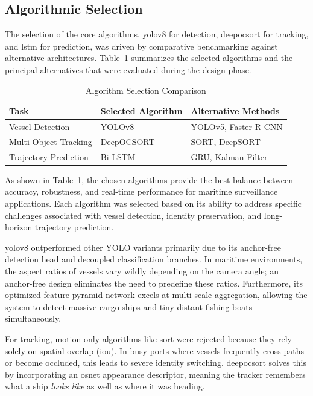 \subsection{Algorithmic Selection}


The selection of the core algorithms, \gls{yolov8} for detection, \gls{deepocsort} for tracking, and \gls{lstm} for prediction, was driven by comparative benchmarking against alternative architectures. Table~\ref{tab:algorithm_comparison} summarizes the selected algorithms and the principal alternatives that were evaluated during the design phase.


\begin{table}[H]
\centering
\caption{Algorithm Selection Comparison}
\label{tab:algorithm_comparison}
\begin{tabular}{|l|l|l|}
\hline
\textbf{Task} & \textbf{Selected Algorithm} & \textbf{Alternative Methods} \\
\hline
Vessel Detection & YOLOv8 & YOLOv5, Faster R-CNN \\
\hline
Multi-Object Tracking & DeepOCSORT & SORT, DeepSORT \\
\hline
Trajectory Prediction & Bi-LSTM & GRU, Kalman Filter \\
\hline
\end{tabular}
\end{table}

As shown in Table~\ref{tab:algorithm_comparison}, the chosen algorithms provide the best balance between accuracy, robustness, and real-time performance for maritime surveillance applications. Each algorithm was selected based on its ability to address specific challenges associated with vessel detection, identity preservation, and long-horizon trajectory prediction.

\gls{yolov8} outperformed other YOLO variants primarily due to its anchor-free detection head and decoupled classification branches. In maritime environments, the aspect ratios of vessels vary wildly depending on the camera angle; an anchor-free design eliminates the need to predefine these ratios. Furthermore, its optimized feature pyramid network excels at multi-scale aggregation, allowing the system to detect massive cargo ships and tiny distant fishing boats simultaneously.

For tracking, motion-only algorithms like \gls{sort} were rejected because they rely solely on spatial overlap (\gls{iou}). In busy ports where vessels frequently cross paths or become occluded, this leads to severe identity switching. \gls{deepocsort} solves this by incorporating an \gls{osnet} appearance descriptor, meaning the tracker remembers what a ship \textit{looks like} as well as where it was heading. 

